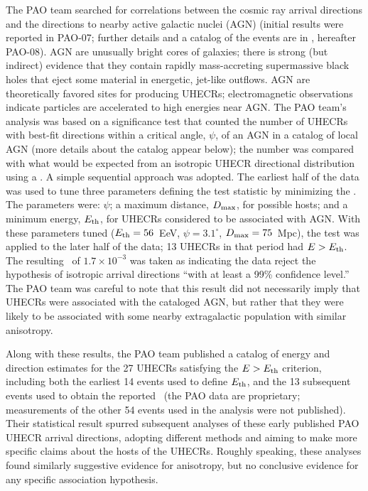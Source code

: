 The PAO team searched for correlations between the cosmic ray arrival
directions and the directions to nearby active galactic nuclei (AGN)
(initial results were reported in PAO-07; further details and a catalog of
the events are in \cite{PAO08-AGN}, hereafter PAO-08). AGN are unusually
bright cores of galaxies; there is strong (but indirect) evidence that they
contain rapidly mass-accreting supermassive black holes that eject some
material in energetic, jet-like outflows.  AGN are theoretically favored
sites for producing UHECRs; electromagnetic observations indicate particles
are accelerated to high energies near AGN.  The PAO team's analysis was
based on a significance test that counted the number of UHECRs with best-fit
directions within a critical angle, $\psi$, of an AGN in a catalog of local
AGN (more details about the catalog appear below); the number was compared
with what would be expected from an isotropic UHECR directional distribution
using a \pval.  A simple sequential approach was adopted.  The earliest half
of the data was used to tune three parameters defining the test statistic by
minimizing the \pval.  The parameters were:  $\psi$; a maximum distance,
$D_{\rm max}$, for possible hosts; and a minimum energy, $E_{\rm th}$, for UHECRs
considered to be associated with AGN.  With these parameters tuned
($E_{\rm th}=56$~EeV, $\psi=3.1^\circ$, $D_{\rm max}=75$~Mpc), the test was applied to
the later half of the data; 13 UHECRs in that period had $E>E_{\rm th}$.  The
resulting \pval\ of $1.7\times 10^{-3}$ was taken as indicating the data
reject the hypothesis of isotropic arrival directions ``with at least a 99\%
confidence level.''  The PAO team was careful to note that this result did
not necessarily imply that UHECRs were associated with the cataloged AGN,
but rather that they were likely to be associated with some nearby
extragalactic population with similar anisotropy.

Along with these results, the PAO team published a catalog of energy and
direction estimates for the 27 UHECRs satisfying the $E>E_{\rm th}$ criterion,
including both the earliest 14 events used to define $E_{\rm th}$, and the 13
subsequent events used to obtain the reported \pval\ (the PAO data are
proprietary; measurements of the other 54 events used in the analysis were
not published).  Their statistical result
spurred subsequent analyses of these early published PAO UHECR
arrival directions, adopting different methods and aiming to make more
specific claims about the hosts of the UHECRs.  Roughly speaking, these
analyses found similarly suggestive evidence for anisotropy, but no
conclusive evidence for any specific association hypothesis.

